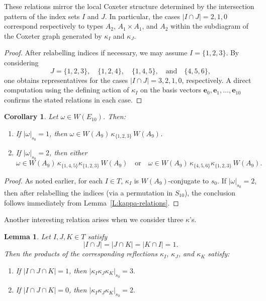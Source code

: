 \documentclass[11pt]{amsart}
\numberwithin{equation}{section}
\newtheorem{lem}[thm]{Lemma}
\newtheorem{cor}[thm]{Corollary}
\newcommand{\vve}{\mathbf{e}}
\begin{document}
These relations mirror the local Coxeter structure determined by the 
intersection pattern of the index sets \(I\) and \(J\).  
In particular, the cases \(|I\cap J|=2,1,0\) correspond respectively to 
types \(A_2\), \(A_1\times A_1\), and \(A_2\) within the 
subdiagram of the Coxeter graph generated by 
\(\kappa_I\) and \(\kappa_J\).

\begin{proof}
After relabelling indices if necessary, we may assume \(I=\{1,2,3\}\).
By considering 
\[
J=\{1,2,3\},\quad \{1,2,4\},\quad \{1,4,5\},\quad \text{and}\quad \{4,5,6\},
\]
one obtains representatives for the cases 
\(|I\cap J|=3,2,1,0\), respectively.
A direct computation using the defining action of \(\kappa_I\)
on the basis vectors \(\vve_0,\vve_1,\dots,\vve_{10}\)
confirms the stated relations in each case.
\end{proof}


\begin{cor}\label{C:small-s0}
Let $\omega \in W(E_{10})$. Then:
\begin{enumerate}
\item If $|\omega|_{s_0} = 1$, then $\omega \in W(A_9)\, \kappa_{\{1,2,3\}}\, W(A_9)$.
\item If $|\omega|_{s_0} = 2$, then either 
\[
\omega \in W(A_9)\, \kappa_{\{1,4,5\}} \kappa_{\{1,2,3\}}\, W(A_9)
\quad\text{or}\quad
\omega \in W(A_9)\, \kappa_{\{4,5,6\}} \kappa_{\{1,2,3\}}\, W(A_9).
\]
\end{enumerate}
\end{cor}

\begin{proof}
As noted earlier, for each $I \in T$, $\kappa_I$ is $W(A_9)$-conjugate to $s_0$.  
If $|\omega|_{s_0}=2$, then after relabelling the indices (via a permutation in $S_{10}$),
the conclusion follows immediately from Lemma~\ref{L:kappa-relations}.
\end{proof}

Another interesting relation arises when we consider three $\kappa$'s.

\begin{lem}\label{L:three-kappas}
Let $I,J,K \in T$ satisfy
\[
|I\cap J| = |J\cap K| = |K\cap I| = 1.
\]
Then the products of the corresponding reflections $\kappa_I$, $\kappa_J$, and $\kappa_K$
satisfy:
\begin{enumerate}
\item If \( |I\cap J\cap K| = 1 \), then \( |\kappa_I \kappa_J \kappa_K|_{s_0} = 3. \)
\item If \( |I\cap J\cap K| = 0 \), then \( |\kappa_I \kappa_J \kappa_K|_{s_0} = 2. \)
\end{enumerate}
\end{lem}
\end{document}
